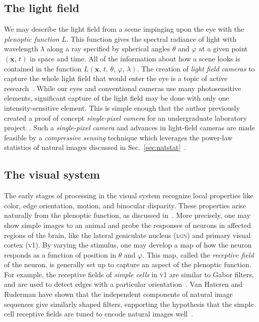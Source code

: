 \documentclass[aps,reprint,floatfix]{revtex4-2}
\theoremstyle{plain}
\theoremstyle{definition}
\renewcommand\phi\varphi%
\begin{document}
\subsection{The light field}\label{sec:light-field}

We may describe the light field from a scene impinging upon the eye with the
\emph{plenoptic function} $L$. This function gives the spectral radiance of
light with wavelength $\lambda$ along a ray specified by spherical angles
$\theta$ and $\phi$ at a given point $(\bm{x},\, t)$ in space and time. All of
the information about how a scene looks is contained in the function
$L(\bm{x},\, t,\, \theta,\, \phi,\, \lambda)$. The creation of \emph{light field
cameras} to capture the whole light field that would enter the eye is a topic
of active research~\cite{light-field}. While our eyes and conventional cameras
use many photosensitive elements, significant capture of the light field may be
done with only one intensity-sensitive element. This is simple enough that the
author previously created a proof of concept \emph{single-pixel camera} for an
undergraduate laboratory project~\cite{csjlab,*single-pixel}. Such a
\emph{single-pixel camera} and advances in light-field cameras are made feasible
by a \emph{compressive sensing} technique which leverages the power-law
statistics of natural images discussed in
Sec.~\ref{sec:natstat}~\cite{compressed-sensing}.

\subsection{The visual system}\label{sec:visual-system}

The early stages of processing in the visual system recognize local properties
like color, edge orientation, motion, and binocular disparity. These properties
arise naturally from the plenoptic function, as discussed in~\cite{plenoptic}.
More precisely, one may show simple images to an animal and probe the responses
of neurons in affected regions of the brain, like the lateral geniculate nucleus
(\textsc{lgn}) and primary visual cortex (\textsc{v1}). By varying the stimulus,
one may develop a map of how the neuron responds as a function of position in
$\theta$ and $\phi$. This map, called the \emph{receptive field} of the neuron,
is generally set up to capture an aspect of the plenoptic function. For example,
the receptive fields of \emph{simple cells} in \textsc{v1} are similar to Gabor
filters, and are used to detect edges with a particular
orientation~\cite{plenoptic}. Van Hateren and Ruderman have shown that the
independent components of natural image sequences give similarly shaped filters,
supporting the hypothesis that the simple cell receptive fields are tuned to
encode natural images well~\cite{strf}.
\end{document}
